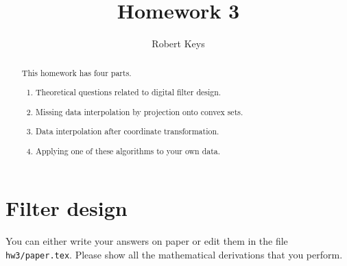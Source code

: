 \author{Robert Keys}
\title{Homework 3}

\begin{abstract}
  This homework has four parts. 
  \begin{enumerate}
  \item Theoretical questions related to digital filter design.
  \item Missing data interpolation by projection onto convex sets.
  \item Data interpolation after coordinate transformation.
  \item Applying one of these algorithms to your own data.
  \end{enumerate}
\end{abstract}

\section{Filter design}

You can either write your answers on paper or edit them in the file
\verb#hw3/paper.tex#. Please show all the mathematical
derivations that you perform.

